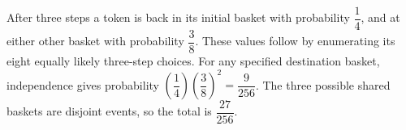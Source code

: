After three steps a token is back in its initial basket with probability $\dfrac{1}{4}$, and at either other basket with probability $\dfrac{3}{8}$. These values follow by enumerating its eight equally likely three-step choices. For any specified destination basket, independence gives probability $(\dfrac{1}{4})(\dfrac{3}{8})^2=\dfrac{9}{256}$. The three possible shared baskets are disjoint events, so the total is $\boxed{\dfrac{27}{256}}$.

